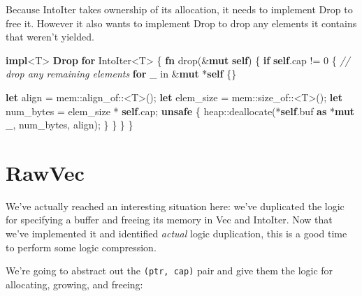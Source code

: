 \documentclass[a4paper,]{book}
\newenvironment{Shaded}{\begin{snugshade}}{\end{snugshade}}
\newcommand{\KeywordTok}[1]{\textcolor[rgb]{0.13,0.29,0.53}{\textbf{{#1}}}}
\newcommand{\DecValTok}[1]{\textcolor[rgb]{0.00,0.00,0.81}{{#1}}}
\newcommand{\CommentTok}[1]{\textcolor[rgb]{0.56,0.35,0.01}{\textit{{#1}}}}
\newcommand{\NormalTok}[1]{{#1}}
\begin{document}
Because IntoIter takes ownership of its allocation, it needs to
implement Drop to free it. However it also wants to implement Drop to
drop any elements it contains that weren't yielded.

\begin{Shaded}
\begin{Highlighting}[]
\KeywordTok{impl}\NormalTok{<T> }\KeywordTok{Drop} \KeywordTok{for} \NormalTok{IntoIter<T> \{}
    \KeywordTok{fn} \NormalTok{drop(&}\KeywordTok{mut} \KeywordTok{self}\NormalTok{) \{}
        \KeywordTok{if} \KeywordTok{self}\NormalTok{.cap != }\DecValTok{0} \NormalTok{\{}
            \CommentTok{// drop any remaining elements}
            \KeywordTok{for} \NormalTok{_ in &}\KeywordTok{mut} \NormalTok{*}\KeywordTok{self} \NormalTok{\{\}}

            \KeywordTok{let} \NormalTok{align = mem::align_of::<T>();}
            \KeywordTok{let} \NormalTok{elem_size = mem::size_of::<T>();}
            \KeywordTok{let} \NormalTok{num_bytes = elem_size * }\KeywordTok{self}\NormalTok{.cap;}
            \KeywordTok{unsafe} \NormalTok{\{}
                \NormalTok{heap::deallocate(*}\KeywordTok{self}\NormalTok{.buf }\KeywordTok{as} \NormalTok{*}\KeywordTok{mut} \NormalTok{_, num_bytes, align);}
            \NormalTok{\}}
        \NormalTok{\}}
    \NormalTok{\}}
\NormalTok{\}}
\end{Highlighting}
\end{Shaded}

\section{RawVec}\label{sec--vec-raw}

We've actually reached an interesting situation here: we've duplicated
the logic for specifying a buffer and freeing its memory in Vec and
IntoIter. Now that we've implemented it and identified \emph{actual}
logic duplication, this is a good time to perform some logic
compression.

We're going to abstract out the \texttt{(ptr,\ cap)} pair and give them
the logic for allocating, growing, and freeing:
\end{document}
